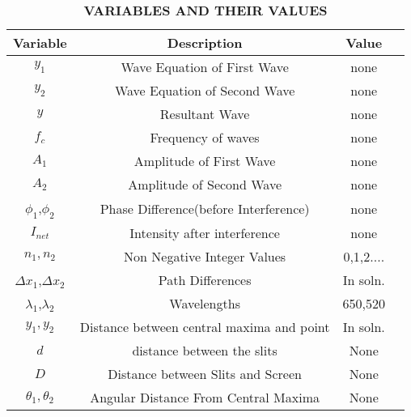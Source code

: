 \documentclass[journal,12pt,twocolumn]{IEEEtran}
\theoremstyle{remark}
\begin{document}
\begin{table}
    \centering
    \begin{tabular}{|c|c|c|c|}
    \hline
       \textbf{Variable}& \textbf{Description}& \textbf{Value}\\\hline
         $y_1$& Wave Equation of First Wave&none\\\hline
          $y_2$&Wave Equation of Second Wave &none\\\hline
         $y$&   Resultant Wave&none\\\hline
          $f_c$& Frequency of waves&none\\\hline
         $A_1$& Amplitude of First Wave&none\\\hline
         $A_2$& Amplitude of Second Wave&none\\\hline
         $\phi_1$,$\phi_2$& Phase Difference(before Interference)&none\\\hline
         $I_{net}$& Intensity after interference&none\\\hline
         $n_1,n_2$& Non Negative Integer Values&0,1,2....\\\hline
         $\Delta x_1$,$\Delta x_2$& Path Differences&In soln.\\\hline
         $\lambda_{1}$,$\lambda_2$& Wavelengths&650,520\\\hline
         $y_1,y_2$& Distance between central maxima and point&In soln.\\\hline
         $d$& distance between the slits&None\\\hline
         $D$& Distance between Slits and Screen&None\\\hline
         $\theta_1,\theta_2$& Angular Distance From Central Maxima&None\\\hline
    \end{tabular}
    \caption{\textbf{VARIABLES AND THEIR VALUES}}
    \label{tab:my_label}
\end{table}
\end{document}
